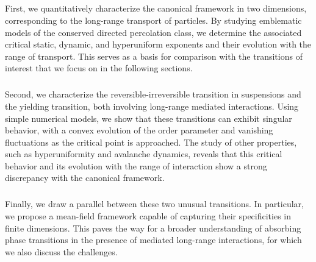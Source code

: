 \subparagraph{}First, we quantitatively characterize the canonical framework in two dimensions, corresponding to the long-range transport of particles. By studying emblematic models of the conserved directed percolation class, we determine the associated critical static, dynamic, and hyperuniform exponents and their evolution with the range of transport. This serves as a basis for comparison with the transitions of interest that we focus on in the following sections.

\subparagraph{}Second, we characterize the reversible-irreversible transition in suspensions and the yielding transition, both involving long-range mediated interactions. Using simple numerical models, we show that these transitions can exhibit singular behavior, with a convex evolution of the order parameter and vanishing fluctuations as the critical point is approached. The study of other properties, such as hyperuniformity and avalanche dynamics, reveals that this critical behavior and its evolution with the range of interaction show a strong discrepancy with the canonical framework.

\subparagraph{}Finally, we draw a parallel between these two unusual transitions. In particular, we propose a mean-field framework capable of capturing their specificities in finite dimensions. This paves the way for a broader understanding of absorbing phase transitions in the presence of mediated long-range interactions, for which we also discuss the challenges.